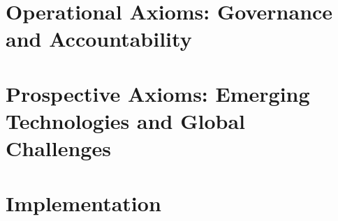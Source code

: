 \documentclass[12pt,a4paper,twoside,openright]{book}
\begin{document}






\part{Operational Axioms: Governance and Accountability}






\part{Prospective Axioms: Emerging Technologies and Global Challenges}












\part{Implementation}






\end{document}
